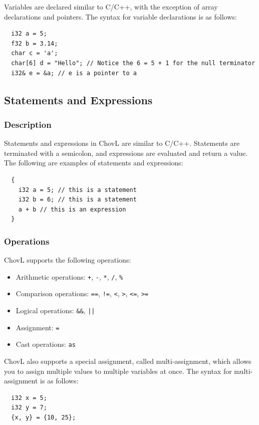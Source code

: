 Variables are declared similar to C/C++, with the exception of array declarations and pointers. The syntax for variable declarations is as follows:
\begin{verbatim}
  i32 a = 5;
  f32 b = 3.14;
  char c = 'a';
  char[6] d = "Hello"; // Notice the 6 = 5 + 1 for the null terminator
  i32& e = &a; // e is a pointer to a
\end{verbatim}

\subsection{Statements and Expressions}
\subsubsection{Description}
Statements and expressions in ChovL are similar to C/C++. Statements are terminated with a semicolon, and expressions are evaluated and return a value. The following are examples of statements and expressions:
\begin{verbatim}
  {
    i32 a = 5; // this is a statement
    i32 b = 6; // this is a statement
    a + b // this is an expression
  }
\end{verbatim}

\subsubsection{Operations}
ChovL supports the following operations:
\begin{itemize}
  \item Arithmetic operations: \texttt{+}, \texttt{-}, \texttt{*}, \texttt{/}, \texttt{\%}
  \item Comparison operations: \texttt{==}, \texttt{!=}, \texttt{<}, \texttt{>}, \texttt{<=}, \texttt{>=}
  \item Logical operations: \texttt{\&\&}, \texttt{||}
  \item Assignment: \texttt{=}
  \item Cast operations: \texttt{as}
\end{itemize}

ChovL also supports a special assignment, called multi-assignment, which allows you to assign multiple values to multiple variables at once. The syntax for multi-assignment is as follows:
\begin{verbatim}
  i32 x = 5;
  i32 y = 7;
  {x, y} = {10, 25};
\end{verbatim}

